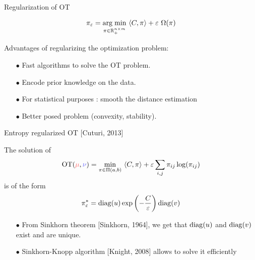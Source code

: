 \documentclass[pdf,aspectratio=169,10pt]{beamer}
\begin{document}
\begin{frame}{Regularization of OT}
\begin{block}{}
$$\pi_{\varepsilon} = \argmin_{\pi\in\R^{n\times m}_+} \ \langle C,\pi\rangle + \varepsilon\ \Omega(\pi)$$
\end{block}

\vspace{0.2cm}Advantages of regularizing the optimization problem:
\begin{itemize}
\item[$\bullet$] Fast algorithms to solve the OT problem.
\item[$\bullet$] Encode prior knowledge on the data.
\item[$\bullet$] For statistical purposes : smooth the distance estimation
\item[$\bullet$] Better posed problem (convexity, stability).
\end{itemize}


\end{frame}



\begin{frame}{Entropy regularized OT [Cuturi, 2013]}
\begin{block}{}
The solution of 
$$\OT(\er{\mu},\eb{\nu}) = \min_{\pi\in\Pi(a,b)} \ \langle C,\pi\rangle + \varepsilon \sum_{i,j} \pi_{ij}\log(\pi_{ij})$$
is of the form
$$\pi_\varepsilon^* = \mathop{\rm diag}\nolimits(u)\exp\left(-\frac{C}{\varepsilon}\right)\mathop{\rm diag}\nolimits(v)$$
\end{block}

{\vspace{0.3cm}\begin{itemize}
\item[$\bullet$] From Sinkhorn theorem [Sinkhorn, 1964], we get that $\mathop{\rm diag}\nolimits(u)$ and $\mathop{\rm diag}\nolimits(v)$ exist and are unique.
\item[$\bullet$] Sinkhorn-Knopp algorithm [Knight, 2008] allows to solve it efficiently
\end{itemize}}
\end{frame}
\end{document}
